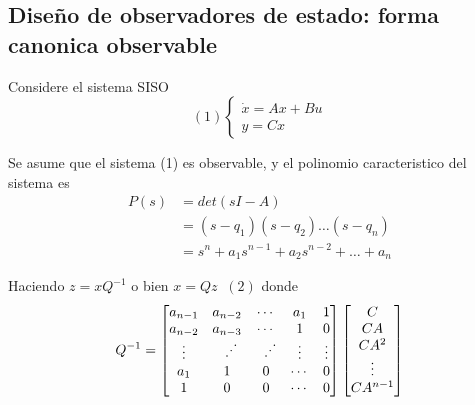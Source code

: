 \subsection{Diseño de observadores de estado: forma canonica observable}

Considere el sistema SISO
\[
    (1)
    \left\{
        \begin{array}{lll}
            \dot{x} = Ax + Bu\\
            y = Cx
        \end{array}
    \right.
\]

Se asume que el sistema (1) es observable, y el polinomio caracteristico del sistema es 
\[
    \begin{split}
        P(s) & = det(sI-A) \\
        & = (s-q_{1}) ( s-q_{2}) \ldots (s-q_{n})\\
        & = s^{n} + a_{1}s^{n-1} + a_{2}s^{n-2} + \ldots + a_{n}
    \end{split}
\]

Haciendo \( z=xQ^{-1} \) o bien \( x=Qz \;\; (2)\) donde 
\[
    Q^{-1} =
    \begin{bmatrix}
    a_{n-1} & a_{n-2} & \cdots & a_{1} & 1 \\
    a_{n-2} & a_{n-3} & \cdots & 1 & 0\\
    \vdots & \rotatebox{90}{\(\ddots\)} & \rotatebox{90}{\(\ddots\)} & \vdots & \vdots\\
    a_{1} & 1 & 0 & \cdots & 0\\
    1 & 0 & 0 & \cdots & 0
    \end{bmatrix}
    \begin{bmatrix}
        C\\
        CA\\
        CA^{2}\\
        \vdots\\
        CA^{n-1}
    \end{bmatrix}
\]

